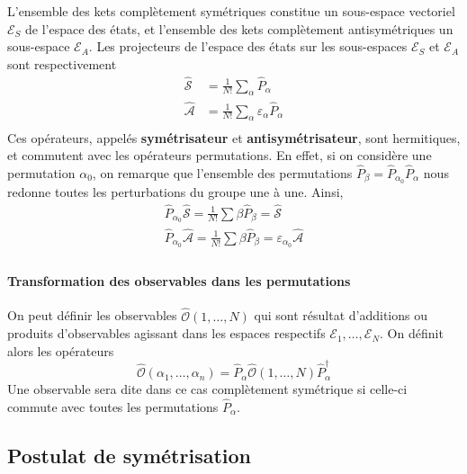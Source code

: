             L’ensemble des kets complètement symétriques constitue un sous-espace vectoriel $\mathcal{E}_S$ de l’espace des états, et l’ensemble des kets complètement antisymétriques un sous-espace $\mathcal{E}_{A}$. Les projecteurs de l’espace des états sur les sous-espaces $\mathcal{E}_S$ et $\mathcal{E}_A$ sont respectivement 
            \begin{align*}
                \hat{\mathcal{S}} &= \frac{1}{N!} \sum_{\alpha} \hat{P}_{\alpha} \\
                \hat{\mathcal{A}} &= \frac{1}{N!} \sum_{\alpha} \varepsilon_{\alpha} \hat{P}_{\alpha} \\
            \end{align*}
            Ces opérateurs, appelés \textbf{symétrisateur} et \textbf{antisymétrisateur}, sont hermitiques, et commutent avec les opérateurs permutations. En effet, si on considère une permutation $\alpha_0$, on remarque que l’ensemble des permutations $\hat{P}_{\beta} = \hat{P}_{\alpha_0} \hat{P}_{\alpha}$ nous redonne toutes les perturbations du groupe une à une. Ainsi,
            \begin{align*}
                \hat{P}_{\alpha_0} \hat{\mathcal{S}} = \frac{1}{N!} \sum{\beta} \hat{P}_{\beta} = \hat{\mathcal{S}} \\
                \hat{P}_{\alpha_0} \hat{\mathcal{A}} = \frac{1}{N!} \sum{\beta} \hat{P}_{\beta} = \varepsilon_{\alpha_0} \hat{\mathcal{A}} \\
            \end{align*}

            \paragraph{Transformation des observables dans les permutations}

            On peut définir les observables $\hat{\mathcal{O}}(1,\ldots,N)$ qui sont résultat d'additions ou produits d’observables agissant dans les espaces respectifs $\mathcal{E}_1, \ldots, \mathcal{E}_N$. On définit alors les opérateurs 
            \[ \hat{\mathcal{O}}(\alpha_1, \ldots, \alpha_n) = \hat{P}_{\alpha} \hat{\mathcal{O}}(1,\ldots,N) \hat{P}_{\alpha}^{\dagger} \]   
            Une observable sera dite dans ce cas complètement symétrique si celle-ci commute avec toutes les permutations $\hat{P}_{\alpha}$.

        \subsection{Postulat de symétrisation}
    
